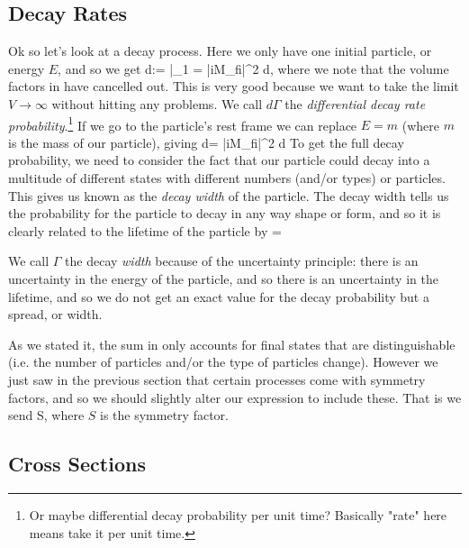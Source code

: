 \subsection{Decay Rates}

Ok so let's look at a decay process. Here we only have one initial particle, or energy $E$, and so we get 
\bse 
    d\Gamma := \bigg|_{1} = |iM_{fi}|^2  d\Pi,
\ese 
where we note that the volume factors in  have cancelled out. This is very good because we want to take the limit $V\to\infty$ without hitting any problems. We call $d\Gamma$ the \textit{differential decay rate probability}.\footnote{Or maybe differential decay probability per unit time? Basically "rate" here means take it per unit time.} If we go to the particle's rest frame we can replace $E=m$ (where $m$ is the mass of our particle), giving 
\bse 
    d\Gamma = |iM_{fi}|^2  d\Pi
\ese 
To get the full decay probability, we need to consider the fact that our particle could decay into a multitude of different states with different numbers (and/or types) or particles. This gives us 
\noindent known as the \textit{decay width} of the particle. The decay width tells us the probability for the particle to decay in any way shape or form, and so it is clearly related to the lifetime of the particle by 
\be 
\label{eqn:Lifetime}
    \tau =
\ee 

\br 
    We call $\Gamma$ the decay \textit{width} because of the uncertainty principle: there is an uncertainty in the energy of the particle, and so there is an uncertainty in the lifetime, and so we do not get an exact value for the decay probability but a spread, or width. 
\er 

\br 
    As we stated it, the sum in  only accounts for final states that are distinguishable (i.e. the number of particles and/or the type of particles change). However we just saw in the previous section that certain processes come with symmetry factors, and so we should slightly alter our expression to include these. That is we send 
    \bse 
        \Gamma \to S\cdot \Gamma,
    \ese 
    where $S$ is the symmetry factor.
\er 

\subsection{Cross Sections}

